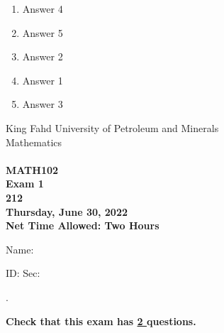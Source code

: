 \documentclass[amsfonts,bezier,leqno,fleqn,12pt,a4paper]{article}
\begin{document}
{{{\begin{large}
\begin{enumerate}
\begin{enumerate}
\item  Answer 4
\item  Answer 5
\item  Answer 2
\item  Answer 1
\item  Answer 3

\end{enumerate}
\newpage


\end{enumerate}
\end{large}


\newpage


\thispagestyle{empty}
\begin{center}
    \begin{large}
        King Fahd University of Petroleum and Minerals \\ 
        Mathematics  \\ 
        \vspace*{4.5cm}
        {\bf {} }  \hfill {\bf {}} \\
        {\bf MATH102 }  \\
        {\bf Exam 1 }  \\
        {\bf 212 }  \\
        {\bf Thursday, June 30, 2022 }  \\ 
        {\bf Net Time Allowed: Two Hours }  \\
        \vspace*{0.2cm}

    \end{large}
\end{center}

\large{Name:  }\hrulefill

\vspace{3mm}

\large{ID: } \hrulefill \large{  Sec: } \hrulefill \large{.

\vspace{1cm}

\large{\bf{Check that this exam has {\underline{ 2 }} questions.}}

\vspace{1cm}

}}}}
\end{document}
